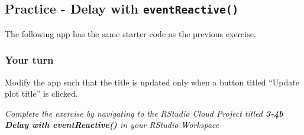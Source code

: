\documentclass[
  letterpaper,
  DIV=11,
  numbers=noendperiod]{scrreprt}
\newenvironment{Shaded}{\begin{snugshade}}{\end{snugshade}}
\newcommand{\AttributeTok}[1]{\textcolor[rgb]{0.40,0.46,0.14}{#1}}
\newcommand{\CommentTok}[1]{\textcolor[rgb]{0.37,0.37,0.37}{#1}}
\newcommand{\ControlFlowTok}[1]{\textcolor[rgb]{0.00,0.46,0.62}{#1}}
\newcommand{\FunctionTok}[1]{\textcolor[rgb]{0.28,0.35,0.67}{#1}}
\newcommand{\NormalTok}[1]{\textcolor[rgb]{0.00,0.46,0.62}{#1}}
\newcommand{\OtherTok}[1]{\textcolor[rgb]{0.00,0.46,0.62}{#1}}
\newcommand{\SpecialCharTok}[1]{\textcolor[rgb]{0.37,0.37,0.37}{#1}}
\begin{document}
\begin{Shaded}
\end{Shaded}

\hypertarget{practice---delay-with-eventreactive}{%
\subsection{\texorpdfstring{Practice - Delay with
\texttt{eventReactive()}}{Practice - Delay with eventReactive()}}\label{practice---delay-with-eventreactive}}

The following app has the same starter code as the previous exercise.

\hypertarget{your-turn-25}{%
\subsubsection{Your turn}\label{your-turn-25}}

Modify the app such that the title is updated only when a button titled
``Update plot title'' is clicked.

\emph{Complete the exercise by navigating to the RStudio Cloud Project
titled \textbf{3-4b Delay with eventReactive()} in your RStudio
Workspace}
\end{document}
